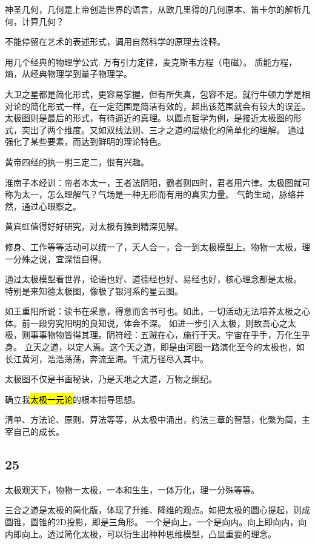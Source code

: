 神圣几何，几何是上帝创造世界的语言，从欧几里得的几何原本、笛卡尔的解析几何，计算几何？

不能停留在艺术的表述形式，调用自然科学的原理去诠释。

用几个经典的物理学公式: 万有引力定律，麦克斯韦方程（电磁）。
质能方程，熵，从经典物理学到量子物理学。

大卫之星都是简化形式，更容易掌握，但有所失真，包容不足。就行牛顿力学是相对论的简化形式一样，在一定范围是简洁有效的，超出该范围就会有较大的误差。
太极图则是最后的形式，有待逼近的真理。以圆点哲学为例，是接近太极图的形式，突出了两个维度。又如双线法则、三才之道的层级化的简单化的理解。
通过强化了某些要素，而达到鲜明的理论特色。

黄帝四经的执一明三定二，很有兴趣。

淮南子本经训：帝者本太一，王者法阴阳，霸者则四时，君者用六律。太极图就可称为太一，怎么理解气？气场是一种无形而有用的真实力量。
气韵生动，脉络井然，通过心眼察之。

黄宾虹值得好好研究，对太极有独到精深见解。

修身、工作等等活动可以统一了，天人合一，合一到太极模型上。物物一太极，理一分殊之说，宜深悟自得。

通过太极模型看世界，论语也好、道德经也好、易经也好，核心理念都是太极。
特别是来知德太极图，像极了银河系的星云图。

如王重阳所说：读书在采意，得意而舍书可也。如此，一切活动无法培养太极之心体。前一段穷究阳明的良知说，体会不深。
如进一步引入太极，则致吾心之太极，则事事物物皆得其理。阴符经：五贼在心，施行于天。宇宙在乎手，万化生乎身。
立天之道，以定人焉。这个天之道，即是由河图一路演化至今的太极也，如长江黄河，浩浩荡荡，奔流至海。千流万径尽入其中。

太极图不仅是书画秘诀，乃是天地之大道，万物之纲纪。

确立我\hl{太极一元论}的根本指导思想。

清单、方法论、原则、算法等等，从太极中涌出，约法三章的智慧，化繁为简，主宰自己的成长。

\subsection{25}

太极观天下，物物一太极，一本和生生，一体万化，理一分殊等等。

三合之道是太极的简化版，体现了升维、降维的观点。如把太极的圆心提起，则成圆锥，圆锥的2D投影，即是三角形。
一个是向上，一个是向内。向上即向内，向内即向上。透过简化太极，可以衍生出种种思维模型，凸显重要的理念。

